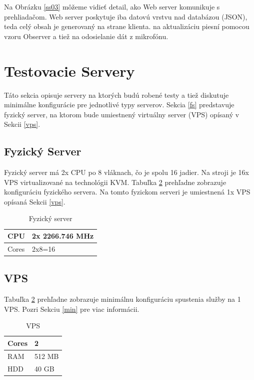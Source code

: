 \documentclass[11pt]{article}
\newif\ifknowhow
\newcommand{\ommited}{ VYNECHANÉ }
\begin{document}
Na Obrázku \ref{ss03} môžeme vidieť detail, ako Web server komunikuje s prehliadačom. Web server poskytuje iba datovú vrstvu nad databázou (JSON), teda celý obsah je generovaný na strane klienta. \ifknowhow Ide o tučného klieta, kde URL routing, generovanie frontendu a logika aplikácie je presunutá ku klientovi. Server iba odpovedá na požiadavky, ktoré nevyhnutne potrebujú databázu alebo pripojenie k Pipeline. Websockets interfejs je požitý \else\ommited{}\fi na aktualizáciu piesní pomocou vzoru Observer a tiež na odosielanie dát z mikrofónu. 

\section{Testovacie Servery}

Táto sekcia opisuje servery na ktorých budú robené testy a tiež diskutuje minimálne konfigurácie pre jednotlivé typy serverov. Sekcia \ref{fs} predstavuje fyzický server, na ktorom bude umiestnený virtuálny server (VPS) opísaný v Sekcii \ref{vps}.

\subsection{Fyzický Server \label{fs}}

Fyzický server má 2x CPU po 8 vláknach, čo je spolu 16 jadier. Na stroji je 16x VPS virtualizované na technológii KVM. Tabuľka \ref{fs02} prehľadne zobrazuje konfiguráciu fyzického servera. Na tomto fyzickom serveri je umiestnená 1x VPS opísaná Sekcii \ref{vps}.

\begin{table}[htp]
\centering
\begin{tabular}{|l|l|}
\hline
	CPU & 2x 2266.746 MHz\\
\hline
	Cores & 2x8=16\\
\hline
\end{tabular}
\caption{Fyzický server}
\label{fs01}
\end{table}


\subsection{VPS \label{vps}}

Tabuľka \ref{fs02} prehľadne zobrazuje minimálnu konfiguráciu spustenia služby na 1 VPS. Pozri Sekciu \ref{min} pre viac informácii.

\begin{table}[htp]
\centering
\begin{tabular}{|l|l|}
\hline
	Cores & 2\\
\hline
	RAM & 512 MB\\
\hline
	HDD & 40 GB\\
\hline
\end{tabular}
\caption{VPS}
\label{fs02}
\end{table}
\end{document}
